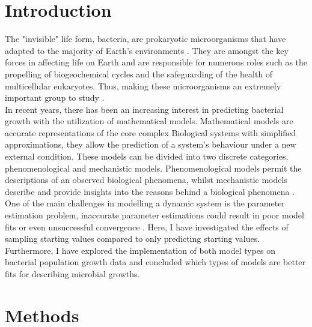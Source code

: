 \documentclass[11pt, a4paper]{article} %
\begin{document}
\newpage
\section{Introduction}
The "invisible" life form, bacteria, are prokaryotic microorganisms that have adapted to the majority of Earth's environments \cite{ovreaas2000population}. They are amongst the key forces in affecting life on Earth and are responsible for numerous roles such as the propelling of biogeochemical cycles and the safeguarding of the health of multicellular eukaryotes. Thus, making these microorganisms an extremely important group to study \cite{gibbons2015microbial, zaccaria2017modeling}.\\ %

\noindent In recent years, there has been an increasing interest in predicting bacterial growth with the utilization of mathematical models. Mathematical models are accurate representations of the core complex Biological systems with simplified approximations, they allow the prediction of a system's behaviour under a new external condition. These models can be divided into two discrete categories, phenomenological and mechanistic models. Phenomenological models permit the descriptions of an observed biological phenomena, whilst mechanistic models describe and provide insights into the reasons behind a biological phenomena \cite{transtrum2016bridging}. One of the main challenges in modelling a dynamic system is the parameter estimation problem, inaccurate parameter estimations could result in poor model fits or even unsuccessful convergence \cite{gabor2015robust}. Here, I have investigated the effects of sampling starting values compared to only predicting starting values. Furthermore, I have explored the implementation of both model types on bacterial population growth data and concluded which types of models are better fits for describing microbial growths.




\section{Methods}
\end{document}
